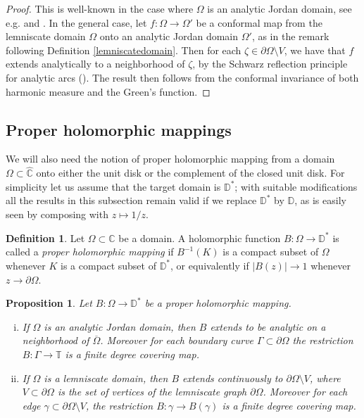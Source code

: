 \documentclass{amsart}
\theoremstyle{plain}
\newtheorem{proposition}[theorem]{Proposition}
\theoremstyle{definition}
\newtheorem{definition}[theorem]{Definition}
\theoremstyle{remark}
\newcommand{\mD}{\mathbb{D}}
\newcommand{\mT}{\mathbb{T}}
\newcommand{\hC}{\widehat{\mathbb{C}}}
\begin{document}
\begin{proof}
This is well-known in the case where $\Omega$ is an analytic Jordan domain, see e.g. \cite[Chapter II, Theorem 2.5]{GarnettMarshall2005} and \cite[Chapter II, Corollary 2.6]{GarnettMarshall2005}. In the general case, let $f:\Omega \to \Omega'$ be a conformal map from the lemniscate domain $\Omega$ onto an analytic Jordan domain $\Omega'$, as in the remark following Definition \ref{lemniscatedomain}. Then for each $\zeta \in \partial \Omega \setminus V$, we have that $f$ extends analytically to a neighborhood of $\zeta$, by the Schwarz reflection principle for analytic arcs (\cite[Theorem 10.37]{Zakeri2021}). The result then follows from the conformal invariance of both harmonic measure and the Green's function.
\end{proof}


\subsection{Proper holomorphic mappings}

We will also need the notion of proper holomorphic mapping from a domain $\Omega \subset \hC$ onto either the unit disk or the complement of the closed unit disk. For simplicity let us assume that the target domain is $\mD^*$; with suitable modifications all the results in this subsection remain valid if we replace $\mD^*$ by $\mD$, as is easily seen by composing with $z \mapsto 1/z$.

\begin{definition}
Let $\Omega \subset \hC$ be a domain. A holomorphic function $B:\Omega \to \mD^*$ is called a \textit{proper holomorphic mapping} if $B^{-1}(K)$ is a compact subset of $\Omega$ whenever $K$ is a compact subset of $\mD^*$, or equivalently if $|B(z)| \to 1$ whenever $z \to \partial \Omega$.

\end{definition}

\begin{proposition}
\label{properextension}
Let $B:\Omega \to \mD^*$ be a proper holomorphic mapping.

\begin{enumerate}[(i)]
\item If $\Omega$ is an analytic Jordan domain, then $B$ extends to be analytic on a neighborhood of $\overline{\Omega}$. Moreover for each boundary curve $\Gamma \subset \partial \Omega$ the restriction $B:\Gamma \to \mT$ is a finite degree covering map.
\item If $\Omega$ is a lemniscate domain, then $B$ extends continuously to $\partial \Omega \setminus V$, where $V \subset \partial \Omega$ is the set of vertices of the lemniscate graph $\partial \Omega$. Moreover for each edge $\gamma \subset \partial \Omega \setminus V$, the restriction $B:\gamma \to B(\gamma)$ is a finite degree covering map.
\end{enumerate}
\end{proposition}
\end{document}

